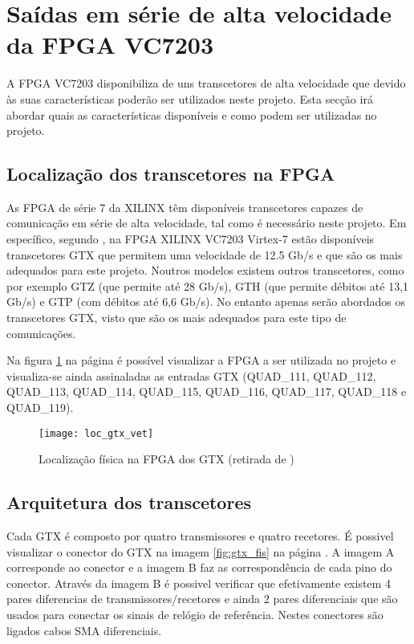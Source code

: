 \section{Saídas em série de alta velocidade da FPGA VC7203}

A FPGA VC7203 disponibiliza de uns transcetores de alta velocidade que devido às suas características poderão ser utilizados neste projeto. Esta secção irá abordar quais as características disponíveis e como podem ser utilizadas no projeto.


\subsection{Localização dos transcetores na FPGA}

As FPGA de série 7 da XILINX têm disponíveis transcetores capazes de comunicação em série de alta velocidade, tal como é necessário neste projeto. Em específico, segundo \cite{R010}, na FPGA XILINX VC7203 Virtex-7 estão disponíveis transcetores GTX que permitem uma velocidade de 12.5 Gb/s e que são os mais adequados para este projeto. Noutros modelos existem outros transcetores, como por exemplo GTZ (que permite até 28 Gb/s), GTH (que permite débitos até 13,1 Gb/s) e GTP (com débitos até 6,6 Gb/s). No entanto apenas serão abordados os transcetores GTX, visto que são os mais adequados para este tipo de comunicações.

Na figura \ref{fig:loc_gtx} na página \pageref{fig:loc_gtx} é possível visualizar a FPGA a ser utilizada no projeto e visualiza-se ainda assinaladas as entradas GTX (QUAD\_111, QUAD\_112, QUAD\_113, QUAD\_114, QUAD\_115, QUAD\_116, QUAD\_117, QUAD\_118 e QUAD\_119).
 
\begin{figure}[h!]
	\begin{center}
		\leavevmode
		\texttt{[image: loc\_gtx\_vet]}
		\caption[Localização física na FPGA dos GTX]{Localização física na FPGA dos GTX (retirada de \cite{R008})}
		\label{fig:loc_gtx}
	\end{center}
\end{figure}

\subsection{Arquitetura dos transcetores} \label{sub:arqGTX}

Cada GTX é composto por quatro transmissores e quatro recetores. É possivel visualizar o conector do GTX na imagem \ref{fig:gtx_fis} na página \pageref{fig:gtx_fis}. A imagem A corresponde ao conector e a imagem B faz as correspondência de cada pino do conector. Através da imagem B é possivel verificar que efetivamente existem 4 pares diferencias de transmissores/recetores e ainda 2 pares diferenciais que são usados para conectar os sinais de relógio de referência. Nestes conectores são ligados cabos SMA diferenciais.

